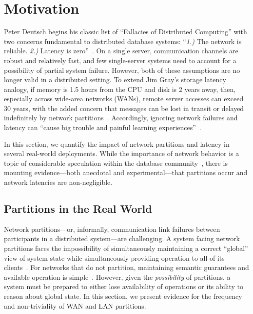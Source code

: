 
\section{Motivation}
\label{sec:motivation}

Peter Deutsch begins his classic list of ``Fallacies of Distributed
Computing'' with two concerns fundamental to distributed database
systems: ``\textit{1.)}  The network is reliable. \textit{2.)} Latency
is zero''~\cite{fallacies-deutsch}. On a single server, communication
channels are robust and relatively fast, and few single-server systems
need to account for a possibility of partial system failure. However,
both of these assumptions are no longer valid in a distributed
setting. To extend Jim Gray's storage latency analogy, if memory is
1.5 hours from the CPU and disk is 2 years away, then, especially
across wide-area networks (WANs), remote server accesses can exceed 30
years, with the added concern that messages can be lost in transit or
delayed indefinitely by network
partitions~\cite{gray-rules}. Accordingly, ignoring network failures
and latency can ``cause big trouble and painful learning
experiences''~\cite{fallacies-deutsch}.

In this section, we quantify the impact of network partitions and
latency in several real-world deployments. While the importance of
network behavior is a topic of considerable speculation within the
database community~\cite{stonebraker2010errors}, there is mounting
evidence---both anecdotal and experimental---that partitions occur and
network latencies are non-negligible.

\subsection{Partitions in the Real World}

Network partitions---or, informally, communication link failures
between participants in a distributed system---are challenging. A
system facing network partitions faces the impossibility of
simultaneously maintaining a correct ``global'' view of system state
while simultaneously providing operation to all of its
clients~\cite{davidson-survey}. For networks that do not partition,
maintaining semantic guarantees and available operation is
simple~\cite{stonebraker2010errors}. However, given the
\textit{possibility} of partitions, a system must be prepared to
either lose availability of operations or its ability to reason about
global state. In this section, we present evidence for the frequency
and non-triviality of WAN and LAN partitions.

